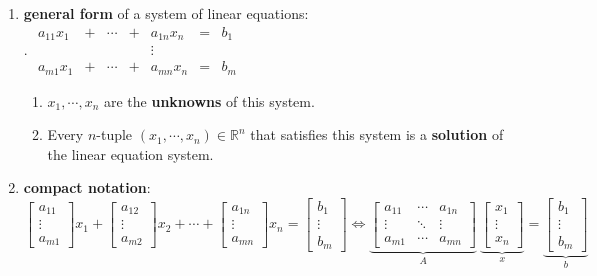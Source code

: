 \begin{enumerate}[itemsep=0.3cm]
    \item \textbf{general form} of a system of linear equations:
    \\
    . \hfill
    $
        \begin{aligned}
            a_{11}x_1 & + & \cdots & + & a_{1n}x_n & = & b_1 \\
            & & & & \vdots \\
            a_{m1}x_1 & + & \cdots & + & a_{mn}x_n & = & b_m
        \end{aligned}
    $
    \hfill \cite{mfml/book/mml/Deisenroth-Faisal-Ong}
    \vspace{0.2cm}
    \begin{enumerate}
        \item $x_1, \cdots , x_n$ are the \textbf{unknowns} of this system.

        \item Every $n$-tuple $(x_1, \cdots , x_n) \in \mathbb{R}^n$ that satisfies this system is a \textbf{solution} of the linear equation system.
    \end{enumerate}


    \item \textbf{compact notation}:
    \\[0.2cm]
    $
        \begin{bmatrix}a_{11}\\ \vdots\\ a_{m1}\end{bmatrix} x_1 +
        \begin{bmatrix}a_{12}\\ \vdots\\ a_{m2}\end{bmatrix} x_2 +
        \cdots +
        \begin{bmatrix}a_{1n}\\ \vdots\\ a_{mn}\end{bmatrix} x_n =
        \begin{bmatrix}b_{1}\\ \vdots\\ b_{m}\end{bmatrix}
    \Longleftrightarrow
        \underset{A}{\underbrace{\begin{bmatrix}
            a_{11} & \cdots & a_{1n} \\
            \vdots & \ddots & \vdots \\
            a_{m1} & \cdots & a_{mn}
        \end{bmatrix}}} \
        \underset{x}{\underbrace{\begin{bmatrix} x_{1} \\ \vdots \\ x_{n} \end{bmatrix}}}
        =
        \underset{b}{\underbrace{\begin{bmatrix} b_{1} \\ \vdots \\ b_{m} \end{bmatrix}}}
    $
    \hfill \cite{mfml/book/mml/Deisenroth-Faisal-Ong}


\end{enumerate}
